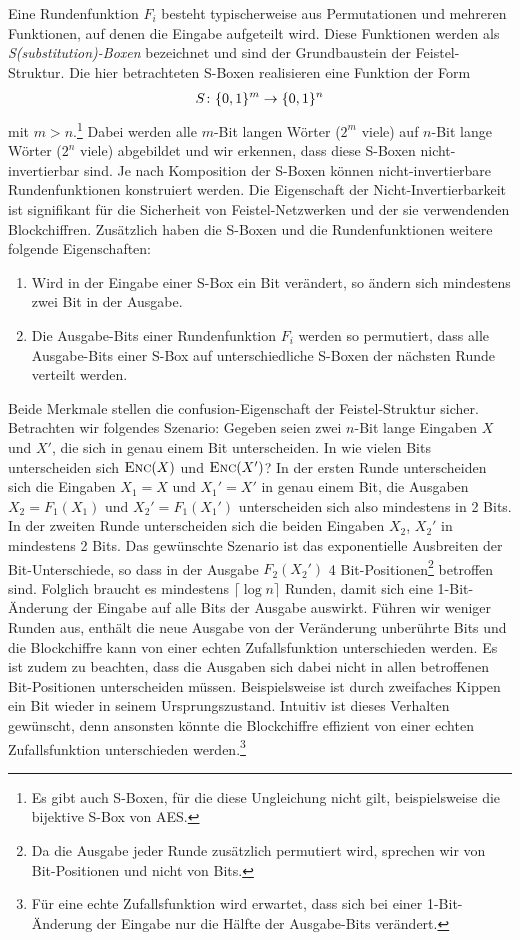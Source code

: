 Eine Rundenfunktion \(F_i\) besteht typischerweise aus Permutationen und mehreren Funktionen, auf denen die Eingabe aufgeteilt wird. Diese Funktionen werden als \textit{S(substitution)-Boxen} bezeichnet und sind der Grundbaustein der Feistel-Struktur. Die hier betrachteten S-Boxen realisieren eine Funktion der Form
\begin{align*}
	S \colon \{0, 1\}^m \rightarrow \{0, 1\}^n
\end{align*}
mit \(m > n\).\footnote{Es gibt auch S-Boxen, für die diese Ungleichung nicht gilt, beispielsweise die bijektive S-Box von AES.} Dabei werden alle $m$-Bit langen Wörter (\(2^m\) viele) auf $n$-Bit lange Wörter (\(2^n\) viele) abgebildet und wir erkennen, dass diese S-Boxen nicht-invertierbar sind. Je nach Komposition der S-Boxen können nicht-invertierbare Rundenfunktionen konstruiert werden. Die Eigenschaft der Nicht-Invertierbarkeit ist signifikant für die Sicherheit von Feistel-Netzwerken und der sie verwendenden Blockchiffren. Zusätzlich haben die S-Boxen und die Rundenfunktionen weitere folgende Eigenschaften:
\begin{enumerate}
	\item Wird in der Eingabe einer S-Box ein Bit verändert, so ändern sich mindestens zwei Bit in der Ausgabe.
	\item Die Ausgabe-Bits einer Rundenfunktion $F_i$ werden so permutiert, dass alle Ausgabe-Bits einer S-Box auf unterschiedliche S-Boxen der nächsten Runde verteilt werden.
\end{enumerate}
Beide Merkmale stellen die confusion-Eigenschaft der Feistel-Struktur sicher. 
Betrachten wir folgendes Szenario: Gegeben seien zwei $n$-Bit lange Eingaben $X$ und $X'$, die sich in genau einem Bit unterscheiden. In wie vielen Bits unterscheiden sich $\textsc{Enc}(X)$ und $\textsc{Enc}(X')$? In der ersten Runde unterscheiden sich die Eingaben $X_1 = X$ und $X_1' = X'$ in genau einem Bit, die Ausgaben $X_2 = F_1(X_1)$ und $X_2' = F_1(X_1')$ unterscheiden sich also mindestens in 2 Bits. In der zweiten Runde unterscheiden sich die beiden Eingaben $X_2$, $X_2'$ in mindestens 2 Bits. Das gewünschte Szenario ist das exponentielle Ausbreiten der Bit-Unterschiede, so dass in der Ausgabe $F_2(X_2')$ 4 Bit-Positionen\footnote{Da die Ausgabe jeder Runde zusätzlich permutiert wird, sprechen wir von Bit-Positionen und nicht von Bits.} betroffen sind. Folglich braucht es mindestens $\lceil \log n \rceil$ Runden, damit sich eine 1-Bit-Änderung der Eingabe auf alle Bits der Ausgabe auswirkt. Führen wir weniger Runden aus, enthält die neue Ausgabe von der Veränderung unberührte Bits und die Blockchiffre kann von einer echten Zufallsfunktion unterschieden werden. Es ist zudem zu beachten, dass die Ausgaben sich dabei nicht in allen betroffenen Bit-Positionen unterscheiden müssen. Beispielsweise ist durch zweifaches Kippen ein Bit wieder in seinem Ursprungszustand. Intuitiv ist dieses Verhalten gewünscht, denn ansonsten könnte die Blockchiffre effizient von einer echten Zufallsfunktion unterschieden werden.\footnote{Für eine echte Zufallsfunktion wird erwartet, dass sich bei einer 1-Bit-Änderung der Eingabe nur die Hälfte der Ausgabe-Bits verändert.}

